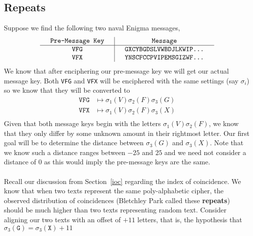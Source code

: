 \subsection{Repeats}
Suppose we find the following two naval Enigma messages,
\[
  \setlength{\arraycolsep}{15pt}
  \begin{array}{c | c}
    \texttt{Pre-Message Key} & \texttt{Message}                \\
    \hline
    \texttt{VFG}             & \texttt{GXCYBGDSLVWBDJLKWIP...} \\
    \texttt{VFX}             & \texttt{YNSCFCCPVIPEMSGIZWF...} \\
  \end{array}
\]
We know that after enciphering our pre-message key we will get our
actual message key. Both \texttt{VFG} and \texttt{VFX} will be
enciphered with the same settings (say $\sigma_i$) so we know that
they will be converted to
\begin{align*}
  \texttt{VFG} & \mapsto \sigma_1(V)\sigma_2(F)\sigma_3(G) \\
  \texttt{VFX} & \mapsto \sigma_1(V)\sigma_2(F)\sigma_3(X) \\
\end{align*}
Given that both message keys begin with the letters
$\sigma_1(V)\sigma_2(F)$, we know that they only differ by some
unknown amount in their rightmost letter. Our first goal will be to
determine the distance between $\sigma_3(G)$ and $\sigma_3(X)$.
Note that we know such a distance ranges between $-25$ and $25$ and
we need not consider a distance of $0$ as this would imply the
pre-message keys are the same.
\\\\Recall our discussion from Section~\ref{ioc} regarding the
index of coincidence. We know that when two texts represent the
same poly-alphabetic cipher, the observed distribution of coincidences
(Bletchley Park called these {\bf{repeats}}) should be much higher
than two texts representing random text. Consider aligning our two
texts with an offset of $+11$ letters, that is, the hypothesis that
$\sigma_3(\texttt{G}) = \sigma_3(\texttt{X}) + 11$
\begin{center}
\end{center}
